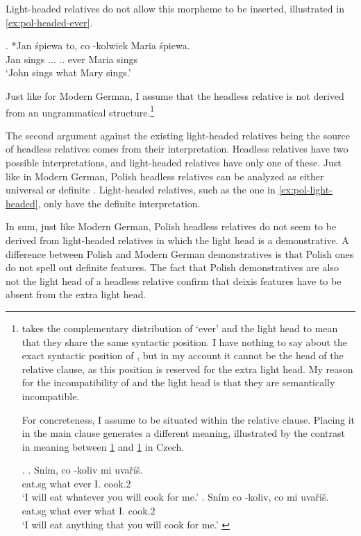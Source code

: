 Light-headed relatives do not allow this morpheme to be inserted, illustrated in \ref{ex:pol-headed-ever}.

\exg. *Jan śpiewa to, co -kolwiek Maria śpiewa.\\
Jan sings ... .. ever Maria sings\\
`John sings what Mary sings.' \label{ex:pol-headed-ever}

Just like for Modern German, I assume that the headless relative is not derived from an ungrammatical structure.\footnote{
\citet{citko2004} takes the complementary distribution of  `ever' and the light head to mean that they share the same syntactic position. I have nothing to say about the exact syntactic position of , but in my account it cannot be the head of the relative clause, as this position is reserved for the extra light head. My reason for the incompatibility of  and the light head is that they are semantically incompatible.

For concreteness, I assume  to be situated within the relative clause. Placing it in the main clause generates a different meaning, illustrated by the contrast in meaning between \ref{ex:cz-wh-ever} and \ref{ex:cz-ever-wh} in Czech.

\ex.
\ag. Sním, co -koliv mi uvaříš.\\
 eat.sg what ever I. cook.2\\
 `I will eat whatever you will cook for me.'\label{ex:cz-wh-ever}
\bg. Sním co -koliv, co mi uvaříš.\\
 eat.sg what ever what I. cook.2\\
 `I will eat anything that you will cook for me.' \label{ex:cz-ever-wh}

\phantom{x}
}

The second argument against the existing light-headed relatives being the source of headless relatives comes from their interpretation. Headless relatives have two possible interpretations, and light-headed relatives have only one of these.
Just like in Modern German, Polish headless relatives can be analyzed as either universal or definite .
Light-headed relatives, such as the one in \ref{ex:pol-light-headed}, only have the definite interpretation.

In sum, just like Modern German, Polish headless relatives do not seem to be derived from light-headed relatives in which the light head is a demonstrative. A difference between Polish and Modern German demonstratives is that Polish ones do not spell out definite features. The fact that Polish demonstratives are also not the light head of a headless relative confirm that deixis features have to be absent from the extra light head.

